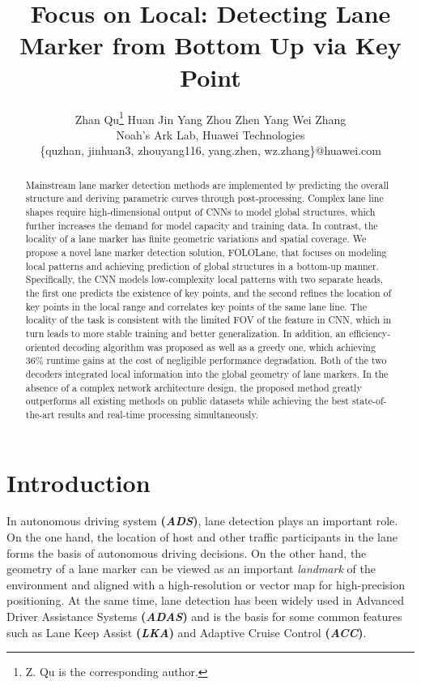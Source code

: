 \documentclass[final]{cvpr}
\begin{document}
	
\title{Focus on Local: Detecting Lane Marker from Bottom Up via Key Point}
\author{
    \vspace{0.3em} Zhan Qu\thanks{Z. Qu is the corresponding author.} \enspace Huan Jin \enspace Yang Zhou \enspace Zhen Yang \enspace Wei Zhang\\
    {Noah's Ark Lab, Huawei Technologies}\\
    {\{quzhan, jinhuan3, zhouyang116, yang.zhen, wz.zhang\}@huawei.com}
}






\maketitle
\thispagestyle{empty}

\begin{abstract}
	Mainstream lane marker detection methods are implemented by predicting the overall structure and deriving parametric curves through post-processing. Complex lane line shapes require high-dimensional output of CNNs to model global structures, which further increases the demand for model capacity and training data. In contrast, the locality of a lane marker has finite geometric variations and spatial coverage. We propose a novel lane marker detection solution, FOLOLane, that focuses on modeling local patterns and achieving prediction of global structures in a bottom-up manner. Specifically, the CNN models low-complexity local patterns with two separate heads, the first one predicts the existence of key points, and the second refines the location of key points in the local range and correlates key points of the same lane line. The locality of the task is consistent with the limited FOV of the feature in CNN, which in turn leads to more stable training and better generalization. In addition, an efficiency-oriented decoding algorithm was proposed as well as a greedy one, which achieving 36\% runtime gains at the cost of negligible performance degradation. Both of the two decoders integrated local information into the global geometry of lane markers. In the absence of a complex network architecture design, the proposed method greatly outperforms all existing methods on public datasets while achieving the best state-of-the-art results and real-time processing simultaneously.
\end{abstract}

\section{Introduction}
In autonomous driving system \textbf{(\textit{ADS})}, lane detection plays an important role. On the one hand, the location of host and other traffic participants in the lane forms the basis of autonomous driving decisions. On the other hand, the geometry of a lane marker can be viewed as an important \textit{landmark} of the environment and aligned with a high-resolution or vector map for high-precision positioning. At the same time, lane detection has been widely used in Advanced Driver Assistance Systems \textbf{(\textit{ADAS})} and is the basis for some common features such as Lane Keep Assist \textbf{(\textit{LKA})} and Adaptive Cruise Control \textbf{(\textit{ACC})}.
\end{document}
